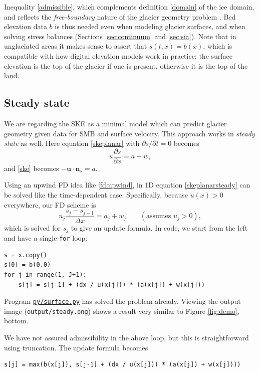 \documentclass[letterpaper,final,12pt,reqno]{amsart}
\newcommand{\bn}{\mathbf{n}}
\newcommand{\bu}{\mathbf{u}}
\begin{document}
Inequality \eqref{admissible}, which complements definition \eqref{domain} of the ice domain, and reflects the \emph{free-boundary} nature of the glacier geometry problem \cite{Bueler2016,Bueler2021conservation}.  Bed elevation data $b$ is thus needed even when modeling glacier surfaces, and when solving stress balances (Sections \ref{sec:continuum} and \ref{sec:sia}).  Note that in unglaciated areas it makes sense to assert that $s(t,x)=b(x)$, which is compatible with how digital elevation models work in practice; the surface elevation is the top of the glacier if one is present, otherwise it is the top of the land.

\subsection*{Steady state}  We are regarding the SKE as a minimal model which can predict glacier geometry given data for SMB and surface velocity.  This approach works in \emph{steady state} as well.  Here equation \eqref{skeplanar} with $\partial s/\partial t=0$ becomes
\begin{equation}
u \frac{\partial s}{\partial x} = a + w, \label{skeplanarsteady}
\end{equation}
and \eqref{ske} becomes $-\bu \cdot \bn_s = a$.

Using an upwind FD idea like \eqref{fd:upwind}, in 1D equation \eqref{skeplanarsteady} can be solved like the time-dependent case.  Specifically, because $u(x)>0$ everywhere, our FD scheme is
\begin{equation}
u_j \frac{s_{j} - s_{j-1}}{\Delta x} = a_j + w_j \qquad (\text{assumes } u_j>0), \label{fd:upwindsteady}
\end{equation}
which is solved for $s_j$ to give an update formula.  In code, we start from the left and have a single \texttt{for} loop:

\begin{lstlisting}[language=PythonPlus, xleftmargin=4mm]
s = x.copy()
s[0] = b(0.0)
for j in range(1, J+1):
    s[j] = s[j-1] + (dx / u(x[j])) * (a(x[j]) + w(x[j]))
\end{lstlisting}

\noindent Program \href{https://github.com/bueler/mccarthy/blob/master/py/surface.py}{\texttt{py/surface.py}} has solved the problem already.  Viewing the output image (\texttt{output/steady.png}) shows a result very similar to Figure \ref{fig:demo}, bottom.

We have not assured admissibility in the above loop, but this is straightforward using truncation.  The update formula becomes
\begin{lstlisting}[language=PythonPlus, xleftmargin=4mm]
    s[j] = max(b(x[j]), s[j-1] + (dx / u(x[j])) * (a(x[j]) + w(x[j])))
\end{lstlisting}
\end{document}
